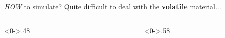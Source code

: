 \documentclass{beamer}
\begin{document}
\begin{frame}{\emph{HOW} to simulate?}
  \textcolor[rgb]{0.5,0.5,0.5}{Quite difficult to deal with the \textbf{\color{blue}volatile} material...}
  \begin{columns}[T] %
    \begin{column}<0->{.48\textwidth}
      \begin{figure}[thpb]
        \centering
        \label{fig:system}
      \end{figure}
    \end{column}%
    \hfill%
    \begin{column}<0->{.58\textwidth}
      \\
      \begin{itemize}

\end{itemize}
\end{column}
\end{columns}
\end{frame}
\end{document}

